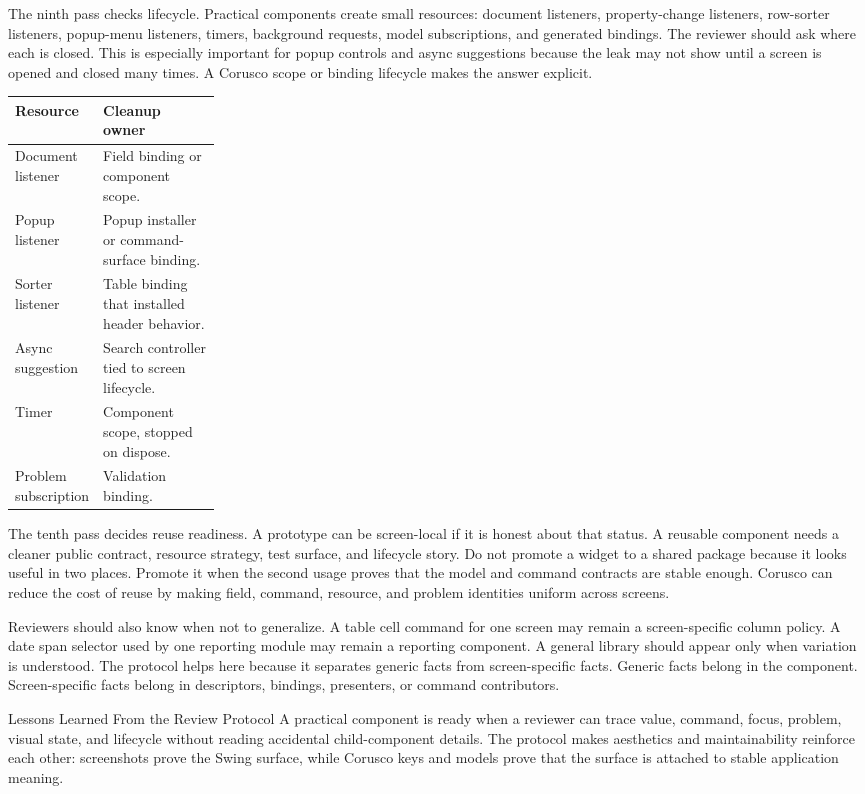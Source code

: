 The ninth pass checks lifecycle. Practical components create small resources:
document listeners, property-change listeners, row-sorter listeners, popup-menu
listeners, timers, background requests, model subscriptions, and generated
bindings. The reviewer should ask where each is closed. This is especially
important for popup controls and async suggestions because the leak may not show
until a screen is opened and closed many times. A Corusco scope or binding
lifecycle makes the answer explicit.

\begin{tabularx}{0.96\linewidth}{@{}p{0.24\linewidth}X@{}}
\toprule
Resource & Cleanup owner\\
\midrule
Document listener & Field binding or component scope.\\
Popup listener & Popup installer or command-surface binding.\\
Sorter listener & Table binding that installed header behavior.\\
Async suggestion & Search controller tied to screen lifecycle.\\
Timer & Component scope, stopped on dispose.\\
Problem subscription & Validation binding.\\
\bottomrule
\end{tabularx}

The tenth pass decides reuse readiness. A prototype can be screen-local if it is
honest about that status. A reusable component needs a cleaner public contract,
resource strategy, test surface, and lifecycle story. Do not promote a widget to
a shared package because it looks useful in two places. Promote it when the
second usage proves that the model and command contracts are stable enough.
Corusco can reduce the cost of reuse by making field, command, resource, and
problem identities uniform across screens.

Reviewers should also know when not to generalize. A table cell command for one
screen may remain a screen-specific column policy. A date span selector used by
one reporting module may remain a reporting component. A general library should
appear only when variation is understood. The protocol helps here because it
separates generic facts from screen-specific facts. Generic facts belong in the
component. Screen-specific facts belong in descriptors, bindings, presenters, or
command contributors.

\begin{principlebox}{Lessons Learned From the Review Protocol}
A practical component is ready when a reviewer can trace value, command, focus,
problem, visual state, and lifecycle without reading accidental child-component
details. The protocol makes aesthetics and maintainability reinforce each other:
screenshots prove the Swing surface, while Corusco keys and models prove that
the surface is attached to stable application meaning.
\end{principlebox}

